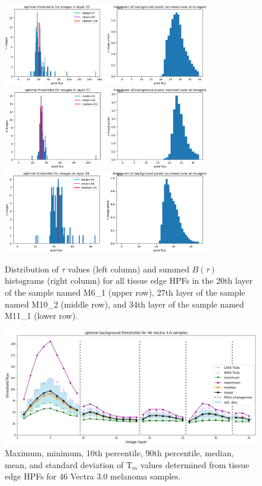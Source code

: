 \documentclass[letterpaper,11pt]{article}
\newcommand{\Tau}{\mathrm{T}}
\begin{document}
\begin{figure}[!ht]
\centering
\includegraphics[width=0.80\textwidth]{images/masking/M6_1_layer_20_background_threshold_plots}
\includegraphics[width=0.80\textwidth]{images/masking/M10_2_layer_27_background_threshold_plots}
\includegraphics[width=0.80\textwidth]{images/masking/M11_1_layer_34_background_threshold_plots}
\caption{\footnotesize Distribution of $\tau$ values (left column) and summed $B(\tau)$ histograms (right column) for all tissue edge HPFs in the 20th layer of the sample named M6\_1 (upper row), 27th layer of the sample named M10\_2 (middle row), and 34th layer of the sample named M11\_1 (lower row).}
\label{fig:threshold_distributions_2}
\end{figure}

\begin{figure}[!ht]
\centering
\includegraphics[width=\textwidth]{images/masking/optimal_background_thresholds_batches_3-9_samples}
\caption{\footnotesize Maximum, minimum, 10th percentile, 90th percentile, median, mean, and standard deviation of $\Tau_{m}$ values determined from tissue edge HPFs for 46 Vectra 3.0 melanoma samples.}
\label{fig:all_sample_thresholds}
\end{figure}
\end{document}
